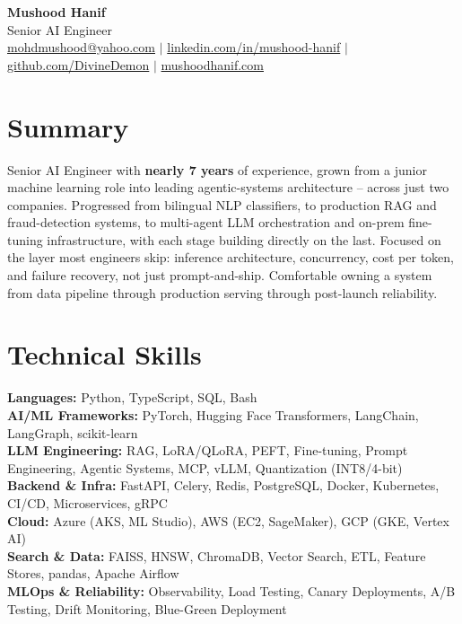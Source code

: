 \documentclass[10.5pt,letterpaper]{article}
\begin{document}
\begin{center}
  {\Huge \textbf{Mushood Hanif}}\\[3pt]
  {\large Senior AI Engineer}\\[5pt]
  \href{mohdmushood@yahoo.com}{\textcolor{linkblue}{mohdmushood@yahoo.com}} \enspace $\vert$ \enspace
  \href{https://linkedin.com/in/mushood-hanif}{\textcolor{linkblue}{linkedin.com/in/mushood-hanif}} \enspace $\vert$ \enspace
  \href{https://github.com/DivineDemon}{\textcolor{linkblue}{github.com/DivineDemon}} \enspace $\vert$ \enspace
  \href{https://mushoodhanif.com}{\textcolor{linkblue}{mushoodhanif.com}}
\end{center}
\vspace{-2pt}

\section*{Summary}
Senior AI Engineer with \textbf{nearly 7 years} of experience, grown from a junior
machine learning role into leading agentic-systems architecture -- across just
two companies. Progressed from bilingual NLP classifiers, to production RAG
and fraud-detection systems, to multi-agent LLM orchestration and on-prem
fine-tuning infrastructure, with each stage building directly on the last.
Focused on the layer most engineers skip: inference architecture, concurrency,
cost per token, and failure recovery, not just prompt-and-ship. Comfortable
owning a system from data pipeline through production serving through
post-launch reliability.

\section*{Technical Skills}
\textbf{Languages:} Python, TypeScript, SQL, Bash \\
\textbf{AI/ML Frameworks:} PyTorch, Hugging Face Transformers, LangChain, LangGraph, scikit-learn \\
\textbf{LLM Engineering:} RAG, LoRA/QLoRA, PEFT, Fine-tuning, Prompt Engineering, Agentic Systems, MCP, vLLM, Quantization (INT8/4-bit) \\
\textbf{Backend \& Infra:} FastAPI, Celery, Redis, PostgreSQL, Docker, Kubernetes, CI/CD, Microservices, gRPC \\
\textbf{Cloud:} Azure (AKS, ML Studio), AWS (EC2, SageMaker), GCP (GKE, Vertex AI) \\
\textbf{Search \& Data:} FAISS, HNSW, ChromaDB, Vector Search, ETL, Feature Stores, pandas, Apache Airflow \\
\textbf{MLOps \& Reliability:} Observability, Load Testing, Canary Deployments, A/B Testing, Drift Monitoring, Blue-Green Deployment
\end{document}
